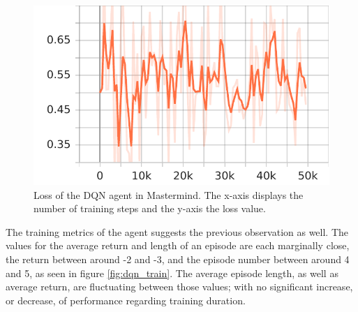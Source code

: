 \begin{figure}[H]
	\centering
	\includegraphics[scale=.75]{images/stats/dqn_50k/Losses_td_loss}
	\caption[DQN loss]{Loss of the DQN agent in Mastermind. The x-axis displays the number of training steps and the y-axis the loss value.}
	\label{fig:dqn_tderr}
\end{figure}

The training metrics of the agent suggests the previous observation as well. The values for the average return and length of an episode are each marginally close, the return between around -2 and -3, and the episode number between around 4 and 5, as seen in figure \ref{fig:dqn_train}. The average episode length, as well as average return, are fluctuating between those values; with no significant increase, or decrease, of performance regarding training duration.


